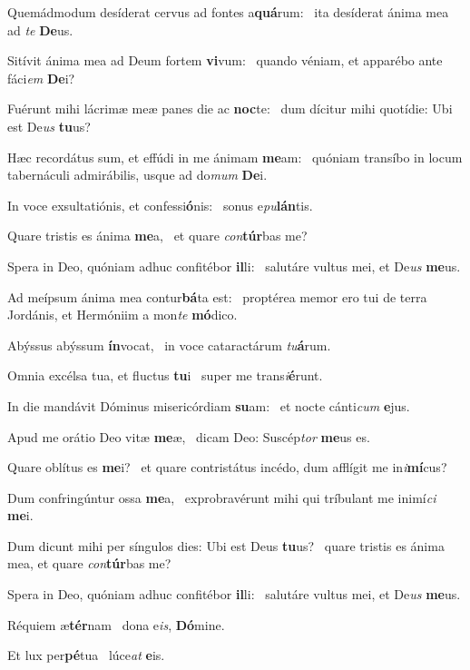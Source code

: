 \item Quemádmodum desíderat cervus ad fontes a\textbf{quá}rum:~\psstar{} ita desíderat ánima mea ad \textit{te} \textbf{De}us.
\item Sitívit ánima mea ad Deum fortem \textbf{vi}vum:~\psstar{} quando véniam, et apparébo ante fáci\textit{em} \textbf{De}i?
\item Fuérunt mihi lácrimæ meæ panes die ac \textbf{noc}te:~\psstar{} dum dícitur mihi quotídie: Ubi est De\textit{us} \textbf{tu}us?
\item Hæc recordátus sum, et effúdi in me ánimam \textbf{me}am:~\psstar{} quóniam transíbo in locum tabernáculi admirábilis, usque ad do\textit{mum} \textbf{De}i.
\item In voce exsultatiónis, et confessi\textbf{ó}nis:~\psstar{} sonus e\textit{pu}\textbf{lán}tis.
\item Quare tristis es ánima \textbf{me}a,~\psstar{} et quare \textit{con}\textbf{túr}bas me?
\item Spera in Deo, quóniam adhuc confitébor \textbf{il}li:~\psstar{} salutáre vultus mei, et De\textit{us} \textbf{me}us.
\item Ad meípsum ánima mea contur\textbf{bá}ta est:~\psstar{} proptérea memor ero tui de terra Jordánis, et Hermóniim a mon\textit{te} \textbf{mó}dico.
\item Abýssus abýssum \textbf{ín}vocat,~\psstar{} in voce cataractárum \textit{tu}\textbf{á}rum.
\item Omnia excélsa tua, et fluctus \textbf{tu}i~\psstar{} super me trans\textit{i}\textbf{é}runt.
\item In die mandávit Dóminus misericórdiam \textbf{su}am:~\psstar{} et nocte cánti\textit{cum} \textbf{e}jus.
\item Apud me orátio Deo vitæ \textbf{me}æ,~\psstar{} dicam Deo: Suscép\textit{tor} \textbf{me}us es.
\item Quare oblítus es \textbf{me}i?~\psstar{} et quare contristátus incédo, dum afflígit me in\textit{i}\textbf{mí}cus?
\item Dum confringúntur ossa \textbf{me}a,~\psstar{} exprobravérunt mihi qui tríbulant me inimí\textit{ci} \textbf{me}i.
\item Dum dicunt mihi per síngulos dies: Ubi est Deus \textbf{tu}us?~\psstar{} quare tristis es ánima mea, et quare \textit{con}\textbf{túr}bas me?
\item Spera in Deo, quóniam adhuc confitébor \textbf{il}li:~\psstar{} salutáre vultus mei, et De\textit{us} \textbf{me}us.
\item Réquiem æ\textbf{tér}nam~\psstar{} dona e\textit{is}, \textbf{Dó}mine.
\item Et lux per\textbf{pé}tua~\psstar{} lúce\textit{at} \textbf{e}is.